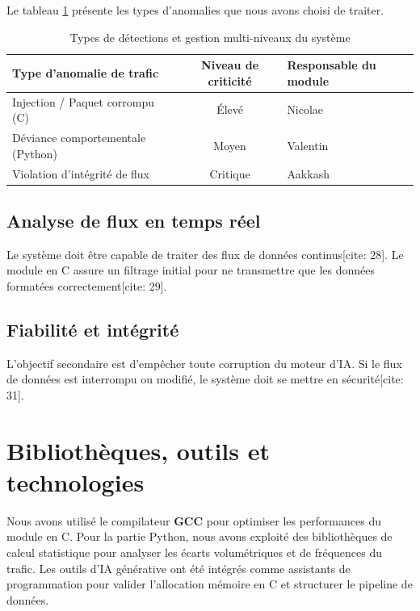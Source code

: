 \documentclass[a4paper, 12pt, twoside]{article}
\begin{document}
Le tableau \ref{menaces} présente les types d’anomalies que nous avons choisi de traiter.

\begin{table}[h]
\begin{center}
\begin{tabular}{|l|c|l|}
\hline
Type d'anomalie de trafic & Niveau de criticité & Responsable du module \\
\hline
Injection / Paquet corrompu (C) & Élevé & Nicolae \\
\hline
Déviance comportementale (Python) & Moyen & Valentin \\
\hline
Violation d'intégrité de flux & Critique & Aakkash \\
\hline
\end{tabular}
\end{center}
\caption{Types de détections et gestion multi-niveaux du système}
\label{menaces}
\end{table}

\subsection{Analyse de flux en temps réel}
Le système doit être capable de traiter des flux de données continus[cite: 28]. Le module en C assure un filtrage initial pour ne transmettre que les données formatées correctement[cite: 29].

\subsection{Fiabilité et intégrité}
L'objectif secondaire est d'empêcher toute corruption du moteur d'IA. Si le flux de données est interrompu ou modifié, le système doit se mettre en sécurité[cite: 31].

\section{Bibliothèques, outils et technologies}
Nous avons utilisé le compilateur \textbf{GCC} pour optimiser les performances du module en C. Pour la partie Python, nous avons exploité des bibliothèques de calcul statistique pour analyser les écarts volumétriques et de fréquences du trafic. Les outils d'IA générative ont été intégrés comme assistants de programmation pour valider l'allocation mémoire en C et structurer le pipeline de données.
\end{document}
